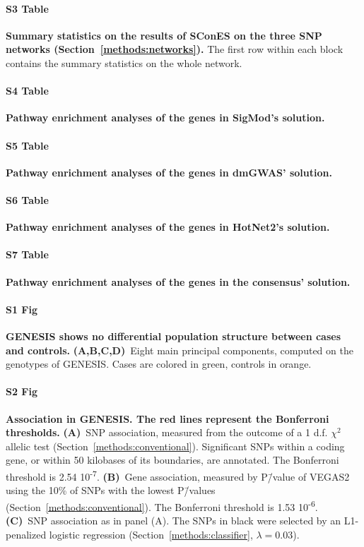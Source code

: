 \documentclass[10pt,letterpaper]{article}
\begin{document}
\paragraph*{S3 Table}
\label{stab:snp_solutions}
\textbf{Summary statistics on the results of SConES on the three SNP networks (Section~\ref{methods:networks}).} The first row within each block contains the summary statistics on the whole network.

\paragraph*{S4 Table}
\label{stab:sigmod_pwy}
\textbf{Pathway enrichment analyses of the genes in SigMod's solution.}

\paragraph*{S5 Table}
\label{stab:dmgwas_pwy}
\textbf{Pathway enrichment analyses of the genes in dmGWAS' solution.}

\paragraph*{S6 Table}
\label{stab:hotnet2_pwy}
\textbf{Pathway enrichment analyses of the genes in HotNet2's solution.}

\paragraph*{S7 Table}
\label{stab:consensus_pwy}
\textbf{Pathway enrichment analyses of the genes in the consensus' solution.}

\paragraph*{S1 Fig}
\label{sfig:pcs}
\textbf{GENESIS shows no differential population structure between cases and controls.} \textbf{(A,B,C,D)}~Eight main principal components, computed on the genotypes of GENESIS. Cases are colored in green, controls in orange.

\paragraph*{S2 Fig}
\label{sfig:snp_gene_manhattan}
\textbf{Association in GENESIS. The red lines represent the Bonferroni thresholds.} \textbf{(A)}~SNP association, measured from the outcome of a 1 d.f. $\chi^2$ allelic test (Section~\ref{methods:conventional}). Significant SNPs within a coding gene, or within 50 kilobases of its boundaries, are annotated. The Bonferroni threshold is 2.54 \texttimes{} 10\textsuperscript{-7}. \textbf{(B)}~Gene association, measured by P\=/value of VEGAS2 \cite{mishra_vegas2:_2015} using the 10\% of SNPs with the lowest P\=/values (Section~\ref{methods:conventional}). The Bonferroni threshold is 1.53 \texttimes{} 10\textsuperscript{-6}. \textbf{(C)}~SNP association as in panel (A). The SNPs in black were selected by an L1-penalized logistic regression (Section~\ref{methods:classifier}, $\lambda = 0.03$).
\end{document}
